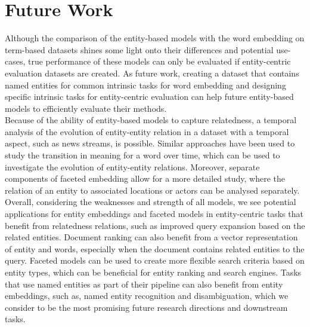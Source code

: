 \section{Future Work}
Although the comparison of the entity-based models with the word embedding on term-based datasets shines some light onto their differences and potential use-cases, true performance of these models can only be evaluated if entity-centric evaluation datasets are created. As future work, creating a dataset that contains named entities for common intrinsic tasks for word embedding and designing specific intrinsic tasks for entity-centric evaluation can help future entity-based models to efficiently evaluate their methods.\\
Because of the ability of entity-based models to capture relatedness, a temporal analysis of the evolution of entity-entity relation in a dataset with a temporal aspect, such as news streams, is possible. Similar approaches have been used to study the transition in meaning for a word over time, which can be used to investigate the evolution of entity-entity relations. Moreover, separate components of faceted embedding allow for a more detailed study, where the relation of an entity to associated locations or actors can be analysed separately. \\
Overall, considering the weaknesses and strength of all models, we see potential applications for entity embeddings and faceted models in entity-centric tasks that benefit from relatedness relations, such as improved query expansion based on the related entities. Document ranking can also benefit from a vector representation of entity and words, especially when the document contains related entities to the query. Faceted models can be used to create more flexible search criteria based on entity types, which can be beneficial for entity ranking and search engines. Tasks that use named entities as part of their pipeline can also benefit from entity embeddings, such as, named entity recognition and disambiguation, which we consider to be the most promising future research directions and downstream tasks.\\
